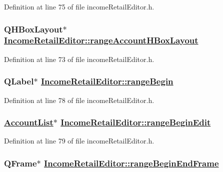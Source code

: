 Definition at line 75 of file income\-Retail\-Editor.h.\hypertarget{classIncomeRetailEditor_r16}{
\subsubsection[rangeAccountHBoxLayout]{\setlength{\rightskip}{0pt plus 5cm}QHBox\-Layout$\ast$ \hyperlink{classIncomeRetailEditor_r16}{Income\-Retail\-Editor::range\-Account\-HBox\-Layout}}}
\label{classIncomeRetailEditor_r16}


Definition at line 73 of file income\-Retail\-Editor.h.\hypertarget{classIncomeRetailEditor_r21}{
\subsubsection[rangeBegin]{\setlength{\rightskip}{0pt plus 5cm}QLabel$\ast$ \hyperlink{classIncomeRetailEditor_r21}{Income\-Retail\-Editor::range\-Begin}}}
\label{classIncomeRetailEditor_r21}


Definition at line 78 of file income\-Retail\-Editor.h.\hypertarget{classIncomeRetailEditor_r22}{
\subsubsection[rangeBeginEdit]{\setlength{\rightskip}{0pt plus 5cm}\hyperlink{classAccountList}{Account\-List}$\ast$ \hyperlink{classIncomeRetailEditor_r22}{Income\-Retail\-Editor::range\-Begin\-Edit}}}
\label{classIncomeRetailEditor_r22}


Definition at line 79 of file income\-Retail\-Editor.h.\hypertarget{classIncomeRetailEditor_r19}{
\subsubsection[rangeBeginEndFrame]{\setlength{\rightskip}{0pt plus 5cm}QFrame$\ast$ \hyperlink{classIncomeRetailEditor_r19}{Income\-Retail\-Editor::range\-Begin\-End\-Frame}}}
\label{classIncomeRetailEditor_r19}


